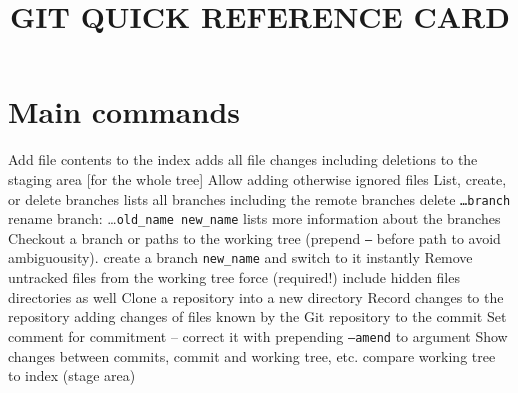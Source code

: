 
\def\cmdOptLBl#1#2{
    \hsize=8.5cm
    \vbox {
        \hbox{
      \hskip 20pt
      \noindent\cmd{\it{\tt--}#1}
      \hfil
        }%
        \hskip 70pt  %
        \hbox to 5.9cm {%
            \hfuzz = 5pt
            \hfil
            \hsize=5.9cm
            \vtop{
                {\it#2}
            }}
    }%
    \par
    \vskip 0.14cm
}


\title{GIT QUICK REFERENCE CARD}

\shortintro

\section{Main commands}
	{Add file contents to the index}
	{adds all file changes including deletions to the staging area [for the whole tree]}
	{Allow adding otherwise ignored files}
	{List, create, or delete branches}
	{lists all branches including the remote branches}
	{delete {\tt \dots branch}}
	{rename branch: \dots {\tt old\_name new\_name}}
	{lists more information about the branches}
	{Checkout a branch or paths to the working tree (prepend {\tt --} before path to avoid ambiguousity).}
	{create a branch {\tt new\_name} and switch to it instantly}
	{Remove untracked files from the working tree}
	{force (required!)}
	{include hidden files}
	{directories as well}
	{Clone a repository into a new directory}
	{Record changes to the repository}
	{adding changes of files known by the Git repository to the commit}
	{Set comment for commitment -- correct it with prepending {\tt --amend} to argument}
	{Show changes between commits, commit and working tree, etc.}
	{compare working tree to index (stage area)}
